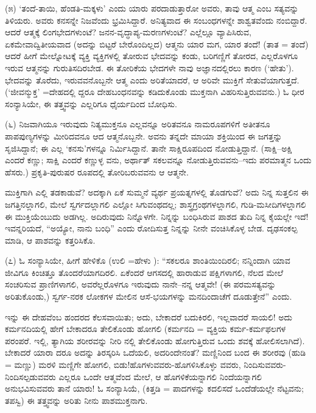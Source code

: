 (೫) ‘ತಂದೆ-ತಾಯಿ, ಹೆಂಡತಿ-ಮಕ್ಕಳು’ ಎಂದು ಯಾರು ಪರದಾಡುತ್ತಾರೋ ಅವರು, ತಾವು ಆತ್ಮ ಎಂಬ ಸತ್ಯವನ್ನು ತಿಳಿಯರು. ಅವರು ಕನಸನ್ನೇ ನಿಜವೆಂದು ಭ್ರಮಿಸಿದ್ದಾರೆ. ಅನಿತ್ಯವಾದ ಈ ಸಂಬಂಧಗಳನ್ನೇ ಶಾಶ್ವತವೆಂದು ನಂಬಿದ್ದಾರೆ. ಆದರೆ ಆತ್ಮಕ್ಕೆ ಲಿಂಗಭೇದಗಳುಂಟೆ? ಜನನ-ವೃದ್ಧಾಪ್ಯ-ಮರಣಗಳುಂಟೆ? ಎಲ್ಲೆಲ್ಲೂ ವ್ಯಾಪಿಸಿರುವ, ಏಕಮೇವಾದ್ವಿತೀಯವಾದ (ಅದನ್ನು ಬಿಟ್ಟರೆ ಬೇರೊಂದಿಲ್ಲದ) ಆತ್ಮನು ಯಾರ ಮಗ, ಯಾರ ತಂದೆ! (ತಾತ = ತಂದೆ) ಆದರೆ ಹೀಗೆ ಮೇಲ್ನೋಟಕ್ಕೆ ವ್ಯಕ್ತಿ ವ್ಯಕ್ತಿಗಳಲ್ಲಿ ತೋರುವ ಭೇದವನ್ನು ಕಂಡು, ಬರಿಗಣ್ಣಿಗೆ ತೋರದ, ಎಲ್ಲರೊಳಗೂ ಇರುವ ಆತ್ಮನನ್ನು ಗುರುತಿಸದಿರಬೇಡ. ಈ ತೋರಿಕೆಯ ಭೇದಗಳೇ ನಾವು ಅಜ್ಞಾನದಲ್ಲಿರಲು ಕಾರಣ (‘ಹೇತು’). ಭೇದವನ್ನು ತೊರೆದು, ಇರುವವನೊಬ್ಬನೇ ಆತ್ಮ ಎಂದು ಅರಿತೆಯಾದರೆ, ಆ ಅರಿವೇ ಮುಕ್ತಿಗೆ ಸೇತುವೆಯಾಗುತ್ತದೆ. (‘ಜೀವನ್ಮುಕ್ತ’ =ದೇಹದಲ್ಲಿ ದ್ದರೂ ದೇಹಬಂಧನವನ್ನು ಕಡಿದುಕೊಂಡು ಮುಕ್ತನಾಗಿ ವಿಹರಿಸುತ್ತಿರುವವನು.) ಓ ಧೀರ ಸಂನ್ಯಾಸಿಯೇ, ಈ ತತ್ತ್ವವನ್ನು ಎಲ್ಲರಿಗೂ ಧೈರ್ಯದಿಂದ ಬೋಧಿಸು.

(೬) ನಿಜವಾಗಿಯೂ ಇರುವುದು ನಿತ್ಯಮುಕ್ತನೂ ಎಲ್ಲವನ್ನೂ ಅರಿತವನೂ ನಾಮರೂಪಗಳಿಗೆ ಅತೀತನೂ ಪಾಪಪುಣ್ಯಗಳನ್ನು ಮೀರಿದವನೂ ಆದ ಆತ್ಮನೊಬ್ಬನೇ. ಅವನು ತನ್ನದೇ ಮಾಯಾ ಶಕ್ತಿಯಿಂದ ಈ ಜಗತ್ತನ್ನು ಸೃಜಿಸಿದ್ದಾನೆ; ಈ ಎಲ್ಲ ‘ಕನಸು’ಗಳನ್ನೂ ನಿರ್ಮಿಸಿದ್ದಾನೆ. ತಾನೇ ಸಾಕ್ಷಿರೂಪದಿಂದ ನೋಡುತ್ತಿದ್ದಾನೆ. (ಸಾಕ್ಷಿ–ಅಕ್ಷಿ ಎಂದರೆ ಕಣ್ಣು; ಸಾಕ್ಷಿ ಎಂದರೆ ಕಣ್ಣುಳ್ಳ ವನು, ಅರ್ಥಾತ್ ಸಕಲವನ್ನೂ ನೋಡುತ್ತಿರುವವನು–ಇದು ಪರಮಾತ್ಮನ ಒಂದು ಹೆಸರು.) ಪ್ರಕೃತಿ-ಪುರುಷರ ರೂಪದಲ್ಲಿ ತೋರಿಬರುವವನು ಆ ಆತ್ಮನೇ.

ಮುಕ್ತಿಗಾಗಿ ಎಲ್ಲಿ ತಡಕಾಡುವೆ? ಅದಕ್ಕಾಗಿ ಏಕೆ ಸುಮ್ಮನೆ ವ್ಯರ್ಥ ಪ್ರಯತ್ನಗಳಲ್ಲಿ ತೊಡಗುವೆ? ಅದು ನಿನ್ನ ಸುತ್ತಲಿನ ಈ ಜಗತ್ತಿನಲ್ಲಾಗಲಿ, ಮೇಲೆ ಸ್ವರ್ಗದಲ್ಲಾಗಲಿ ಎಲ್ಲೋ ಸಿಗುವಂಥದಲ್ಲ; ಶಾಸ್ತ್ರಗ್ರಂಥಗಳಲ್ಲಾಗಲಿ, ಗುಡಿ-ಮಸೀದಿಗಳಲ್ಲಾಗಲಿ ಈ ಮುಕ್ತಿಯೆಂಬುದು ಅಡಗಿಲ್ಲ. ಅದಿರುವುದು ನಿನ್ನೊಳಗೇ. ನಿನ್ನನ್ನು ಬಂಧಿಸಿರುವ ಪಾಶದ ತುದಿ ನಿನ್ನ ಕೈಯಲ್ಲೇ ಇದೆ! ಇವನ್ನರಿಯದೆ, “ಅಯ್ಯೋ, ನಾನು ಬಂಧಿ” ಎಂದು ರೋದಿಸುತ್ತ ನಿನ್ನನ್ನು ನೀನೇ ವಂಚಿಸಿಕೊಳ್ಳ ಬೇಡ. ದೃಢಸಂಕಲ್ಪ ಮಾಡಿ, ಆ ಪಾಶವನ್ನು ಕತ್ತರಿಸಿಕೊ.

(೭) ಓ ಸಂನ್ಯಾಸಿಯೇ, ಹೀಗೆ ಹೇಳಿಕೊ (ಉಲಿ =ಹೇಳು ): “ಸಕಲರೂ ಶಾಂತಿಯಿಂದಿರಲಿ; ನನ್ನಿಂದಾಗಿ ಯಾವ ಜೀವಿಗೂ ಕಿಂಚಿತ್ತೂ ತೊಂದರೆಯಾಗದಿರಲಿ. ಏಕೆಂದರೆ ಆಗಸದಲ್ಲಿ ಹಾರಾಡುವ ಪಕ್ಷಿಗಳಾಗಲಿ, ನೆಲದ ಮೇಲೆ ಸಂಚರಿಸುವ ಪ್ರಾಣಿಗಳಾಗಲಿ, ಅವರೆಲ್ಲರೊಳಗೂ ಇರುವುದು ನಾನೇ–ನನ್ನ ಆತ್ಮವೇ! (ಈ ಪರಮಸತ್ಯವನ್ನು ಅರಿತುಕೊಂಡು,) ಸ್ವರ್ಗ-ನರಕ ಲೋಕಗಳ ಮೇಲಿನ ಆಸೆ-ಭಯಗಳನ್ನು ಮನದಿಂದಾಚೆಗೆ ದೂಡುತ್ತೇನೆ” ಎಂದು.

ಇನ್ನು ಈ ದೇಹವೆಂಬ ಹಂದರದ ಕೆಲಸವಾಯಿತು; ಅದು, ಬೇಕಾದರೆ ಬದುಕಿರಲಿ, ಇಲ್ಲವಾದರೆ ಸಾಯಲಿ! ಅದು ಕರ್ಮನದಿಯಲ್ಲಿ ಹೇಗೆ ಬೇಕಾದರೂ ತೇಲಿಕೊಂಡು ಹೋಗಲಿ (ಕರ್ಮನದಿ = ವ್ಯಕ್ತಿಯ ಕರ್ಮ-ಕರ್ಮಫಲಗಳ ಪರಂಪರೆ. ಇಲ್ಲಿ, ತ್ಯಾಗಿಯ ಶರೀರವನ್ನು ನೀರಿ ನಲ್ಲಿ ತೇಲಿಕೊಂಡು ಹೋಗುತ್ತಿರುವ ಒಂದು ಶವಕ್ಕೆ ಹೋಲಿಸಲಾಗಿದೆ). ಬೇಕಾದರೆ ಯಾರಾ ದರೂ ಅದನ್ನು ತಿರಸ್ಕರಿಸಿ ಒದೆಯಲಿ, ಅದರಿಂದೇನಂತೆ? ಮಣ್ಣಿನಿಂದ ಬಂದ ಈ ಶರೀರವು (ಹುಡಿ = ಮಣ್ಣು) ಮರಳಿ ಮಣ್ಣಿಗೇ ಹೋಗಲಿ, ಬಿಡು!ಹೊಗಳುವವರು-ಹೊಗಳಿಸಿಕೊಳ್ಳು ವವರು, ನಿಂದಿಸುವವರು-ನಿಂದಿಸಲ್ಪಡುವವರು ಎಲ್ಲರೂ ಒಂದೇ ಆತ್ಮವೆಂದ ಮೇಲೆ, ಆ ಹೊಗಳಿಕೆಯನ್ನಾಗಲಿ ನಿಂದೆಯನ್ನಾಗಲಿ ಅನುಭವಿಸುವವರು ತಾನೆ ಯಾರು! ಓ ಸಂನ್ಯಾಸಿಯೆ, (ಕಿತ್ತಡಿ = ಪಾದಗಳನ್ನು ಕದಲಿಸದೆ ಒಂದೆಡೆಯಲ್ಲೇ ನೆಟ್ಟವನು; ತಪಸ್ವಿ) ಈ ತತ್ತ್ವವನ್ನು ಅರಿತು ನೀನು ಪಾಶಮುಕ್ತನಾಗು.

